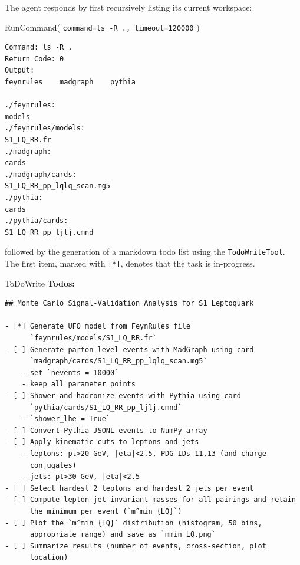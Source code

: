 \documentclass[11pt,oneside]{article}
\numberwithin{equation}{section}
\begin{document}
The agent responds by first recursively listing its current workspace:

\begin{orchestralagentmessage}


    \begin{orchestraltoolmessage}{RunCommand( \texttt{command=ls -R ., timeout=120000} )}
\begin{verbatim}
Command: ls -R .
Return Code: 0
Output:
feynrules    madgraph    pythia

./feynrules:
models
./feynrules/models:
S1_LQ_RR.fr
./madgraph:
cards
./madgraph/cards:
S1_LQ_RR_pp_lqlq_scan.mg5
./pythia:
cards
./pythia/cards:
S1_LQ_RR_pp_ljlj.cmnd
\end{verbatim}
    \end{orchestraltoolmessage}

\end{orchestralagentmessage}
followed by the generation of a markdown todo list using the \texttt{TodoWriteTool}. The first item, marked with \texttt{[*]}, denotes that the task is in-progress.
\begin{orchestralagentmessage}

    \begin{orchestraltoolmessage}{ToDoWrite}
        \textbf{Todos:}\vspace{-0.2in}
\begin{verbatim}
## Monte Carlo Signal-Validation Analysis for S1 Leptoquark

- [*] Generate UFO model from FeynRules file 
      `feynrules/models/S1_LQ_RR.fr`
- [ ] Generate parton-level events with MadGraph using card 
      `madgraph/cards/S1_LQ_RR_pp_lqlq_scan.mg5`
    - set `nevents = 10000`
    - keep all parameter points
- [ ] Shower and hadronize events with Pythia using card 
      `pythia/cards/S1_LQ_RR_pp_ljlj.cmnd`
    - `shower_lhe = True`
- [ ] Convert Pythia JSONL events to NumPy array
- [ ] Apply kinematic cuts to leptons and jets
    - leptons: pt>20 GeV, |eta|<2.5, PDG IDs 11,13 (and charge 
      conjugates)
    - jets: pt>30 GeV, |eta|<2.5
- [ ] Select hardest 2 leptons and hardest 2 jets per event
- [ ] Compute lepton-jet invariant masses for all pairings and retain
      the minimum per event (`m^min_{LQ}`)
- [ ] Plot the `m^min_{LQ}` distribution (histogram, 50 bins, 
      appropriate range) and save as `mmin_LQ.png`
- [ ] Summarize results (number of events, cross-section, plot 
      location)
\end{verbatim}
    \end{orchestraltoolmessage}
\end{orchestralagentmessage}
\end{document}

